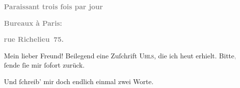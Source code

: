 \pstart
           \begin{otherlanguage}{french}\textcolor{gray}{\textbf{\textbf{Paraissant trois fois par jour}}}\end{otherlanguage}\pend
           
\pstart
           \begin{otherlanguage}{french}\textcolor{gray}{\textbf{\textbf{Bureaux à Paris:}}}\end{otherlanguage}\pend
           
\pstart
           \begin{otherlanguage}{french}\textcolor{gray}{\textbf{\textbf{rue Richelieu 75.}}}\end{otherlanguage}\pend
           
\pstart\center{}Mein lieber Freund!\pend\vspace{0.5em}
\pstart
           Beilegend eine Zuſchrift \textsc{Uhls}, die ich heut erhielt. Bitte\textcolor{gray}{,}{ }ſende{ }ſie mir{ }ſofort zurück.\pend
           
\pstart
           Und{ }ſchreib’ mir doch endlich einmal zwei Worte.\pend
           
